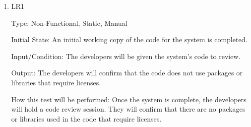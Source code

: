 \documentclass[12pt, titlepage]{article}
\begin{document}
\begin{enumerate}

\item{LR1\\}\label{LR1}

Type: Non-Functional, Static, Manual
					
Initial State: 
An initial working copy of the code for the system is completed.

Input/Condition: 
The developers will be given the system's code to review. 

Output: 
The developers will confirm that the code does not use packages or libraries that require licenses.

How this test will be performed: Once the system is complete, the developers will hold a code review session. They will confirm that there are no packages or libraries used in the code that require licenses.

\end{enumerate}
\end{document}
